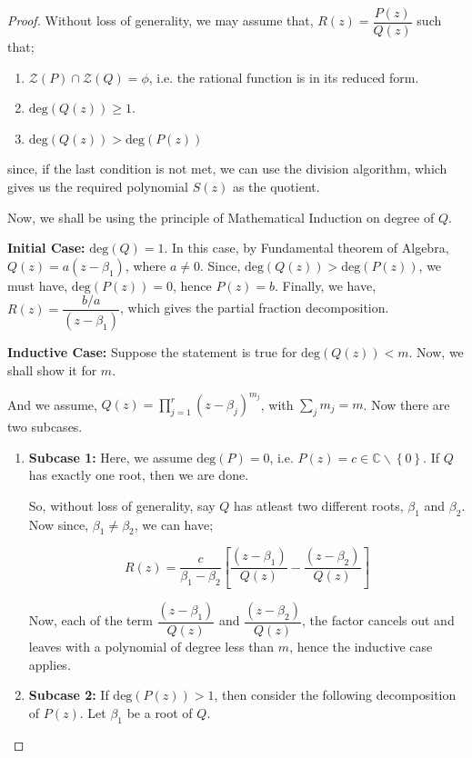 \documentclass[12pt]{article}
\newcommand{\C}{\mathbb{C}}
\theoremstyle{definition}
\begin{document}
\begin{proof}
    Without loss of generality, we may assume that, $R(z) = \dfrac{P(z)}{Q(z)}$ such that;
    \begin{enumerate}
        \item $\mathcal{Z}(P) \cap \mathcal{Z}(Q) = \phi$, i.e. the rational function is in its reduced form.
        \item $\text{deg}(Q(z)) \geq 1$.
        \item $\text{deg}(Q(z)) > \text{deg}(P(z))$
    \end{enumerate}
    since, if the last condition is not met, we can use the division algorithm, which gives us the required polynomial $S(z)$ as the quotient.
    
    Now, we shall be using the principle of Mathematical Induction on degree of $Q$.
    
    \textbf{Initial Case:} $\text{deg}(Q) = 1$. In this case, by Fundamental theorem of Algebra, $Q(z) = a(z - \beta_1)$, where $a \neq 0$. Since, $\text{deg}(Q(z)) > \text{deg}(P(z))$, we must have, $\text{deg}(P(z)) = 0$, hence $P(z) = b$. Finally, we have, $R(z) = \dfrac{b/a}{(z - \beta_1)}$, which gives the partial fraction decomposition.
    
    \textbf{Inductive Case:} Suppose the statement is true for $\text{deg}(Q(z)) < m$. Now, we shall show it for $m$.
    
    And we assume, $Q(z) = \prod_{j = 1}^{r} (z - \beta_j)^{m_j}$, with $\sum_j m_j = m$. Now there are two subcases.
    
    \begin{enumerate}
        \item \textbf{Subcase 1:} Here, we assume $\text{deg}(P) = 0$, i.e. $P(z) = c \in \C\backslash \left\{ 0 \right\}$. If $Q$ has exactly one root, then we are done.
        
        So, without loss of generality, say $Q$ has atleast two different roots, $\beta_1$ and $\beta_2$. Now since, $\beta_1 \neq \beta_2$, we can have;
        
        $$R(z) = \dfrac{c}{\beta_1 - \beta_2} \left[ \dfrac{(z - \beta_1)}{Q(z)} - \dfrac{(z- \beta_2)}{Q(z)}\right]$$
        
        Now, each of the term $\dfrac{(z - \beta_1)}{Q(z)}$ and $\dfrac{(z - \beta_2)}{Q(z)}$, the factor cancels out and leaves with a polynomial of degree less than $m$, hence the inductive case applies.
        
        \item \textbf{Subcase 2:} If $\text{deg}(P(z)) > 1$, then consider the following decomposition of $P(z)$. Let $\beta_1$ be a root of $Q$.
         

\end{enumerate}
\end{proof}
\end{document}
